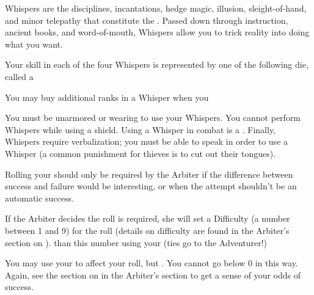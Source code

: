 {    Whispers are the disciplines, incantations, hedge magic, illusion, sleight-of-hand, and minor telepathy that constitute the .  Passed down through instruction, ancient books, and word-of-mouth, Whispers allow you to trick reality into doing what you want.

    Your skill in each of the four Whispers is represented by one of the following \STATIC die, called a \KNAVE


    You may buy additional ranks in a Whisper when you 

    You must be unarmored or wearing  to use your Whispers.  You cannot perform Whispers while using a shield.   Using a Whisper in combat is a .  Finally, Whispers require verbalization; you must be able to speak in order to use a Whisper (a common punishment for thieves is to cut out their tongues).

    Rolling your \KNAVE should only be required by the Arbiter if the difference between success and failure would be interesting, or when the attempt shouldn't be an automatic success.

    If the Arbiter decides the roll is required, she will set a Difficulty (a number between 1 and 9) for the roll (details on difficulty are found in the Arbiter's section on ).  \RB than this number using your \KNAVE (ties go to the Adventurer!)

    You may use your \LUCK to affect your \KNAVE roll, but .  You cannot go below 0 in this way.  Again, see the section on  in the Arbiter's section to get a sense of your odds of success.



}
